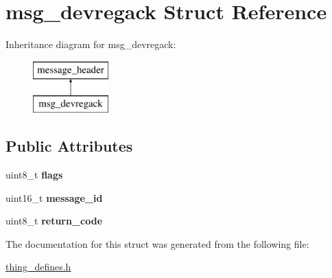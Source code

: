 \hypertarget{structmsg__devregack}{\section{msg\-\_\-devregack Struct Reference}
\label{structmsg__devregack}
}
Inheritance diagram for msg\-\_\-devregack\-:\begin{figure}[H]
\begin{center}
\leavevmode
\includegraphics[height=2.000000cm]{structmsg__devregack}
\end{center}
\end{figure}
\subsection*{Public Attributes}
\begin{DoxyCompactItemize}
\item 
\hypertarget{structmsg__devregack_a4ef800c8c034925f97df8aea1df64ff6}{uint8\-\_\-t {\bfseries flags}}\label{structmsg__devregack_a4ef800c8c034925f97df8aea1df64ff6}

\item 
\hypertarget{structmsg__devregack_ab8a8e50decda829198f79e5100df30c2}{uint16\-\_\-t {\bfseries message\-\_\-id}}\label{structmsg__devregack_ab8a8e50decda829198f79e5100df30c2}

\item 
\hypertarget{structmsg__devregack_ab339916c12670ceb2845cfded76c87fd}{uint8\-\_\-t {\bfseries return\-\_\-code}}\label{structmsg__devregack_ab339916c12670ceb2845cfded76c87fd}

\end{DoxyCompactItemize}


The documentation for this struct was generated from the following file\-:\begin{DoxyCompactItemize}
\item 
\hyperlink{thing__defines_8h}{thing\-\_\-defines.\-h}\end{DoxyCompactItemize}
